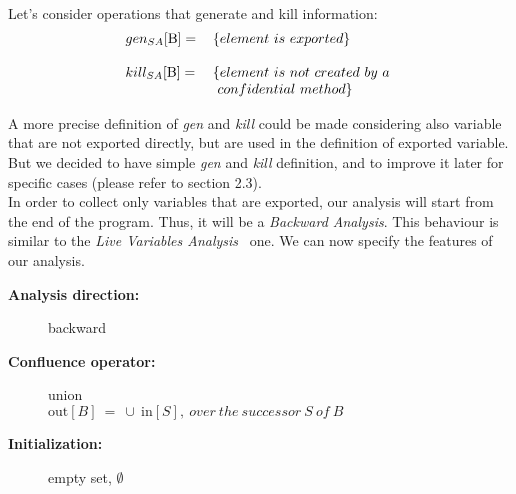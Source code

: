 \documentclass[letterpaper,twocolumn,10pt]{article}
\begin{document}
\paragraph{}
Let's consider operations that generate and kill information:
\begin{align*}
\begin{tabular}{  l l }
	$ gen_{SA}[\text{B}]= $ & $ \{ element\ is\ exported \} $\\ 
	& \\                  
	$  kill_{SA}[\text{B}]= $ & $ \{ element\ is\ not\ created\ by\ a\ $\\ 
	& $\ confidential\ method \} $ \\
\end{tabular}
\end{align*}

A more precise definition of \emph{gen} and \emph{kill} could be made considering also variable that are not exported directly, but are used in the definition of exported variable. But we decided to have simple \emph{gen} and \emph{kill} definition, and to improve it later for specific cases (please refer to section 2.3).\\

\indent
In order to collect only variables that are exported, our analysis will start from the end of the program. Thus, it will be a \emph{Backward Analysis}. This behaviour is similar to the \emph{Live Variables Analysis}~\cite{Nielson:1999:PPA:555142} one. We can now specify the features of our analysis. 
\begin{description}
\item[\textbf{Analysis direction:}] backward
\item[\textbf{Confluence operator: }] union\\ $ \text{out}[B]\ =\ \cup\ \text{in}[S],\ over\ the\ successor\ S\ of\ B\  $
\item[\textbf{Initialization: }] empty set, \quad $ \emptyset $
\end{description}
\end{document}
